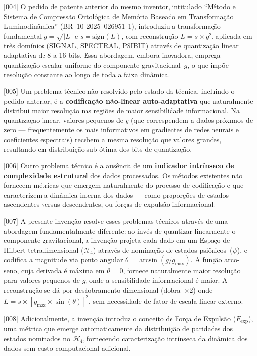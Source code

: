 \documentclass[12pt,a4paper]{article}
\newcommand{\Fexp}{F_{\text{exp}}}
\newcommand{\Hfour}{\mathcal{H}_4}
\begin{document}
{[004]} O pedido de patente anterior do mesmo inventor,
intitulado ``Método e Sistema de Compressão Ontológica de
Memória Baseado em Transformação Luminodinâmica''
(BR~10~2025~026951~1), introduziu a transformação fundamental
$g = \sqrt{|L|}$ e $s = \text{sign}(L)$, com reconstrução
$L = s \times g^2$, aplicada em três domínios (SIGNAL,
SPECTRAL, PSIBIT) através de quantização linear adaptativa de
8 a 16 bits. Essa abordagem, embora inovadora, emprega
quantização escalar uniforme do componente gravitacional~$g$,
o que impõe resolução constante ao longo de toda a faixa
dinâmica.

{[005]} Um problema técnico não resolvido pelo estado da
técnica, incluindo o pedido anterior, é a \textbf{codificação
não-linear auto-adaptativa} que naturalmente distribui maior
resolução nas regiões de maior sensibilidade informacional. Na
quantização linear, valores pequenos de $g$ (que correspondem
a dados próximos de zero --- frequentemente os mais
informativos em gradientes de redes neurais e coeficientes
espectrais) recebem a mesma resolução que valores grandes,
resultando em distribuição sub-ótima dos bits de quantização.

{[006]} Outro problema técnico é a ausência de um
\textbf{indicador intrínseco de complexidade estrutural} dos
dados processados. Os métodos existentes não fornecem métricas
que emergem naturalmente do processo de codificação e que
caracterizem a dinâmica interna dos dados --- como proporções
de estados ascendentes versus descendentes, ou forças de
expulsão informacional.

{[007]} A presente invenção resolve esses problemas técnicos
através de uma abordagem fundamentalmente diferente: ao invés
de quantizar linearmente o componente gravitacional, a invenção
projeta cada dado em um Espaço de Hilbert tetradimensional
($\Hfour$) através de nominação de estados psiônicos~($\psi$),
e codifica a magnitude via ponto angular
$\theta = \arcsin(g/g_{\max})$. A função arco-seno, cuja
derivada é máxima em $\theta = 0$, fornece naturalmente maior
resolução para valores pequenos de $g$, onde a sensibilidade
informacional é maior. A reconstrução se dá por desdobramento
dimensional (dobra~$\times 2$) onde
$L = s \times [g_{\max} \times \sin(\theta)]^2$, sem
necessidade de fator de escala linear externo.

{[008]} Adicionalmente, a invenção introduz o conceito de Força
de Expulsão ($\Fexp$), uma métrica que emerge automaticamente
da distribuição de paridades dos estados nominados no $\Hfour$,
fornecendo caracterização intrínseca da dinâmica dos dados sem
custo computacional adicional.
\end{document}
